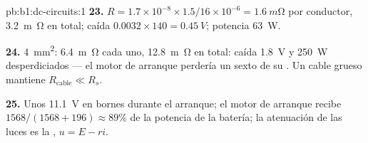 \begin{solution}{pb:b1:dc-circuits:1}
\textbf{23.} $R = 1.7\times10^{-8} \times 1.5/16\times10^{-6} =
\qty{1.6}{m\ohm}$ por conductor, \qty{3.2}{m\ohm} en total; caída $0.0032
\times 140 = \qty{0.45}{V}$; potencia \qty{63}{W}.

\textbf{24.} \qty{4}{mm^2}: \qty{6.4}{m\ohm} cada uno, \qty{12.8}{m\ohm}
en total: caída \qty{1.8}{V} y \qty{250}{W} desperdiciados --- el motor de
arranque perdería un sexto de su . Un cable grueso mantiene
$R_{\text{cable}} \ll R_s$.

\textbf{25.} Unos \qty{11.1}{V} en bornes durante el arranque; el motor de
arranque recibe $1568/(1568 + 196) \approx 89\%$ de la potencia de la
batería; la atenuación de las luces es la , $u = E - ri$.
\end{solution}
